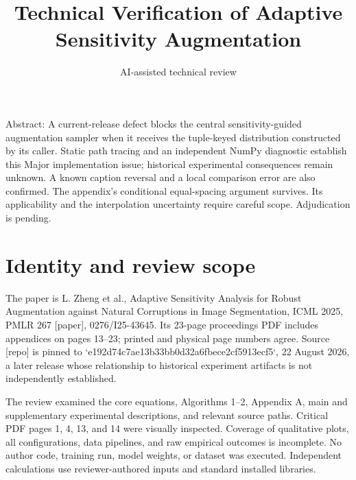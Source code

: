\documentclass[10pt]{article}
\title{Technical Verification of Adaptive Sensitivity Augmentation}
\author{AI-assisted technical review}
\date{}
\begin{document}
\maketitle
Abstract: A current-release defect blocks the central sensitivity-guided augmentation sampler when it receives the tuple-keyed distribution constructed by its caller. Static path tracing and an independent NumPy diagnostic establish this Major implementation issue; historical experimental consequences remain unknown. A known caption reversal and a local comparison error are also confirmed. The appendix’s conditional equal-spacing argument survives. Its applicability and the interpolation uncertainty require careful scope. Adjudication is pending.\par
\section*{Identity and review scope}
The paper is L. Zheng et al., Adaptive Sensitivity Analysis for Robust Augmentation against Natural Corruptions in Image Segmentation, ICML 2025, PMLR 267 [paper], 0276/I25-43645. Its 23-page proceedings PDF includes appendices on pages 13–23; printed and physical page numbers agree. Source [repo] is pinned to `e192d74c7ae13b33bb0d32a6fbece2cf5913ecf5`, 22 August 2026, a later release whose relationship to historical experiment artifacts is not independently established.\par
The review examined the core equations, Algorithms 1–2, Appendix A, main and supplementary experimental descriptions, and relevant source paths. Critical PDF pages 1, 4, 13, and 14 were visually inspected. Coverage of qualitative plots, all configurations, data pipelines, and raw empirical outcomes is incomplete. No author code, training run, model weights, or dataset was executed. Independent calculations use reviewer-authored inputs and standard installed libraries.\par
\end{document}
